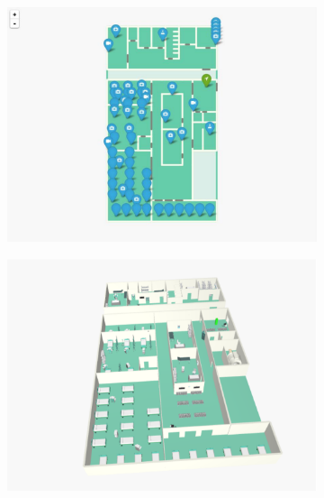 \documentclass[]{egpubl}
\begin{document}
\begin{figure}[htbp] %
   \centering
\hspace{-1.5mm}   
   \begin{subfigure}[b]{0.165\textwidth}
   \includegraphics[width=\textwidth]{images/emergency/13}
   \end{subfigure}
\hspace{-1.5mm}   
   \begin{subfigure}[b]{0.165\textwidth}
   \includegraphics[width=\textwidth]{images/emergency/0}
   \end{subfigure}
\hspace{-1.5mm}   
   \begin{subfigure}[b]{0.165\textwidth}

\end{subfigure}
\end{figure}
\end{document}

